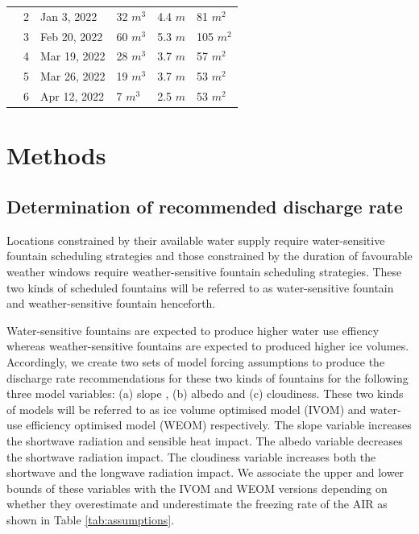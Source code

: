 \documentclass[tc, manuscript]{copernicus}
\begin{document}
\begin{table}
\begin{tabular}{@{}|llllll|@{}}
		\multicolumn{1}{|l|}{} & 2            & Jan 3, 2022   & 32 $m^{3}$      & 4.4 $m$
		                       & 81 $m^{2}$                                                                       \\
		\multicolumn{1}{|l|}{} & 3            & Feb 20, 2022   & 60 $m^{3}$      & 5.3 $m$
		                       & 105 $m^{2}$                                                                       \\
		\multicolumn{1}{|l|}{} & 4            & Mar 19, 2022   & 28 $m^{3}$      & 3.7 $m$
		                       & 57 $m^{2}$                                                                       \\
		\multicolumn{1}{|l|}{} & 5            & Mar 26, 2022   & 19 $m^{3}$      & 3.7 $m$
		                       & 53 $m^{2}$                                                                       \\
		\multicolumn{1}{|l|}{} & 6            & Apr 12, 2022   & 7 $m^{3}$      & 2.5 $m$
		                       & 53 $m^{2}$                                                                       \\
		\bottomrule
	\end{tabular}

\end{table}

\section{Methods}

\subsection{Determination of recommended discharge rate}

Locations constrained by their available water supply require water-sensitive fountain scheduling strategies and
those constrained by the duration of favourable weather windows require weather-sensitive fountain scheduling
strategies. These two kinds of scheduled fountains will be referred to as water-sensitive fountain and
weather-sensitive fountain henceforth.

Water-sensitive fountains are expected to produce higher water use effiency whereas weather-sensitive fountains
are expected to produced higher ice volumes. Accordingly, we create two sets of model forcing assumptions to
produce the discharge rate recommendations for these two kinds of fountains for the following three model
variables: (a) slope , (b) albedo and (c) cloudiness.  These two kinds of models will be referred to as ice
volume optimised model (IVOM) and water-use efficiency optimised model (WEOM) respectively. The slope variable
increases the shortwave radiation and sensible heat impact. The albedo variable decreases the shortwave
radiation impact. The cloudiness variable increases both the shortwave and the longwave radiation impact. We
associate the upper and lower bounds of these variables with the IVOM and WEOM versions depending on whether
they overestimate and underestimate the freezing rate of the AIR as shown in Table \ref{tab:assumptions}.
\end{document}
